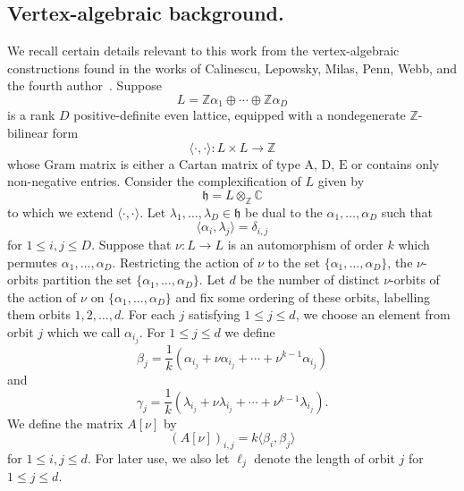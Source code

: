 \documentclass[ALCO,Unicode,published]{cedram}
\begin{document}
\subsection{Vertex-algebraic background.}
We recall certain details relevant to this work from the vertex-algebraic constructions found in the works of Calinescu, Lepowsky, Milas, Penn, Webb, and the fourth author~\cite{CalLM4,CPS,PS1,PS2,PSW}. Suppose 
\begin{equation}
L = \mathbb{Z} \alpha_1 \oplus \cdots \oplus \mathbb{Z}\alpha_D
\end{equation}
 is a rank $D$ positive-definite even lattice, equipped with a nondegenerate $\mathbb{Z}$-bilinear form
\begin{equation}
\langle \cdot, \cdot \rangle: L \times L \rightarrow \mathbb{Z}
\end{equation}
 whose Gram matrix is either a Cartan matrix of type $\mathrm{A}$, $\mathrm{D}$, $\mathrm E$ or contains only non-negative entries. Consider the complexification of $L$ given by 
$$
\mathfrak{h} = L \otimes_{\mathbb{Z}} \mathbb{C}
$$
to which we extend $\langle \cdot, \cdot \rangle$.
 Let $\lambda_1, \dots, \lambda_D \in \mathfrak{h}$ be dual to the $\alpha_1,\dots, \alpha_D$ such that 
\begin{equation*}
\langle \alpha_i, \lambda_j \rangle = \delta_{i,j}
\end{equation*}
for $1 \le i,j \le D$.
 Suppose that $\nu:L \rightarrow L$ is an automorphism of order $k$ which permutes $\alpha_1,\dots, \alpha_D$. Restricting the action of $\nu$ to the set $\{\alpha_1,\dots,\alpha_D\}$,  the $\nu$-orbits partition the set $\{\alpha_1,\dots, \alpha_D \}$.  Let $d$ be the number of distinct $\nu$-orbits of the action of $\nu$ on $\{ \alpha_1,\dots,\alpha_D\}$ and fix some ordering of these orbits, labelling them orbits $1,2,\dots,d$. For each $j$ satisfying $1 \le j \le d$, we choose an element from orbit $j$ which we call $\alpha_{i_j}$. For $1 \le j \le d$ we define 
$$
\beta_j = \frac{1}{k} \left( \alpha_{i_j} + \nu \alpha_{i_j} + \cdots + \nu^{k-1} \alpha_{i_j}\right)
$$
and
$$
\gamma_j = \frac{1}{k} \left( \lambda_{i_j} + \nu \lambda_{i_j} + \cdots + \nu^{k-1} \lambda_{i_j}\right).
$$
We define the matrix $A[\nu]$ by
$$
(A[\nu])_{i,j} = k\langle \beta_i, \beta_j \rangle
$$
for $1 \le i,j \le d$. For later use, we also let $\ell_j$ denote the length of orbit $j$ for $1 \le j \le d$.
\end{document}
